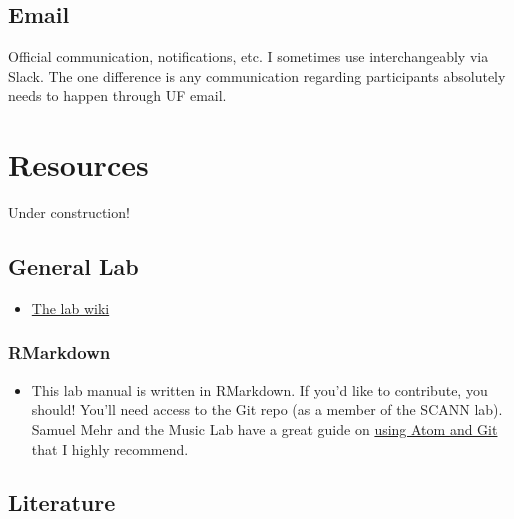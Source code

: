 \documentclass[
  12pt,
]{book}
\providecommand{\tightlist}{%
  \setlength{\itemsep}{0pt}\setlength{\parskip}{0pt}}
\begin{document}
\hypertarget{email}{%
\section{Email}\label{email}}

Official communication, notifications, etc. I sometimes use interchangeably via Slack. The one difference is any communication regarding participants absolutely needs to happen through UF email.

\hypertarget{resources}{%
\chapter{Resources}\label{resources}}

Under construction!

\hypertarget{general-lab}{%
\section{General Lab}\label{general-lab}}

\begin{itemize}
\tightlist
\item
  \href{https://osf.io/d8ke4/wiki/home/}{The lab wiki}
\end{itemize}

\hypertarget{rmarkdown}{%
\subsection{RMarkdown}\label{rmarkdown}}

\begin{itemize}
\tightlist
\item
  This lab manual is written in RMarkdown. If you'd like to contribute, you should! You'll need access to the Git repo (as a member of the SCANN lab). Samuel Mehr and the Music Lab have a great guide on \href{https://handbook-public.themusiclab.org/themusiclab.org/using-atom-and-git}{using Atom and Git} that I highly recommend.
\end{itemize}

\hypertarget{literature}{%
\section{Literature}\label{literature}}
\end{document}
